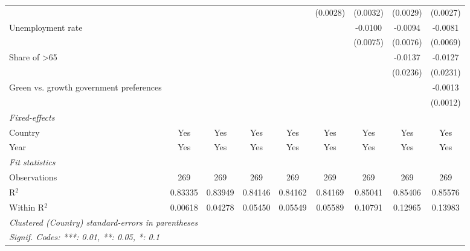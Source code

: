 \begin{table}[htbp]
\begin{tabular}{lcccccccc}
                                                               &          &          &          &          & (0.0028)     & (0.0032)      & (0.0029)               & (0.0027)\\   
      Unemployment rate                                        &          &          &          &          &              & -0.0100       & -0.0094                & -0.0081\\   
                                                               &          &          &          &          &              & (0.0075)      & (0.0076)               & (0.0069)\\   
      Share of >65                                             &          &          &          &          &              &               & -0.0137                & -0.0127\\   
                                                               &          &          &          &          &              &               & (0.0236)               & (0.0231)\\   
      Green vs. growth government preferences                  &          &          &          &          &              &               &                        & -0.0013\\   
                                                               &          &          &          &          &              &               &                        & (0.0012)\\   
      \midrule
      \emph{Fixed-effects}\\
      Country                                                  & Yes      & Yes      & Yes      & Yes      & Yes          & Yes           & Yes                    & Yes\\  
      Year                                                     & Yes      & Yes      & Yes      & Yes      & Yes          & Yes           & Yes                    & Yes\\  
      \midrule
      \emph{Fit statistics}\\
      Observations                                             & 269      & 269      & 269      & 269      & 269          & 269           & 269                    & 269\\  
      R$^2$                                                    & 0.83335  & 0.83949  & 0.84146  & 0.84162  & 0.84169      & 0.85041       & 0.85406                & 0.85576\\  
      Within R$^2$                                             & 0.00618  & 0.04278  & 0.05450  & 0.05549  & 0.05589      & 0.10791       & 0.12965                & 0.13983\\  
      \midrule \midrule
      \multicolumn{9}{l}{\emph{Clustered (Country) standard-errors in parentheses}}\\
      \multicolumn{9}{l}{\emph{Signif. Codes: ***: 0.01, **: 0.05, *: 0.1}}\\
   \end{tabular}
\end{table}


